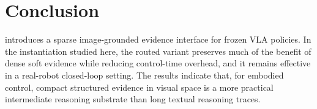 \section{Conclusion}

\method{} introduces a sparse image-grounded evidence interface for frozen VLA policies. In the \openvla{} instantiation studied here, the routed variant preserves much of the benefit of dense soft evidence while reducing control-time overhead, and it remains effective in a real-robot closed-loop setting.
The results indicate that, for embodied control, compact structured evidence in visual space is a more practical intermediate reasoning substrate than long textual reasoning traces.
